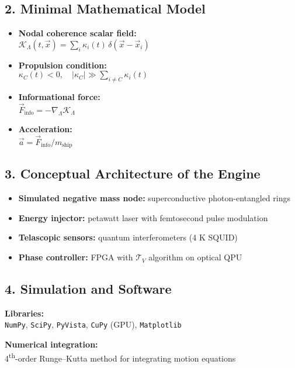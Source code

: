 \documentclass[12pt]{article}
\begin{document}
\subsection*{2. Minimal Mathematical Model}
\begin{itemize}
  \item \textbf{Nodal coherence scalar field:} \\
  $\mathcal{K}_\Lambda(t, \vec{x}) = \sum_i \kappa_i(t)\, \delta(\vec{x} - \vec{x}_i)$

  \item \textbf{Propulsion condition:} \\
  $\kappa_C(t) < 0,\quad |\kappa_C| \gg \sum_{i \ne C} \kappa_i(t)$

  \item \textbf{Informational force:} \\
  $\vec{F}_{\text{info}} = - \nabla_\Lambda \mathcal{K}_\Lambda$

  \item \textbf{Acceleration:} \\
  $\vec{a} = \vec{F}_{\text{info}} / m_{\text{ship}}$
\end{itemize}

\subsection*{3. Conceptual Architecture of the Engine}
\begin{itemize}
  \item \textbf{Simulated negative mass node:} superconductive photon-entangled rings
  \item \textbf{Energy injector:} petawatt laser with femtosecond pulse modulation
  \item \textbf{Telascopic sensors:} quantum interferometers (4 K SQUID)
  \item \textbf{Phase controller:} FPGA with $\mathcal{T}_V$ algorithm on optical QPU
\end{itemize}

\subsection*{4. Simulation and Software}
\textbf{Libraries:} \\
\texttt{NumPy}, \texttt{SciPy}, \texttt{PyVista}, \texttt{CuPy} (GPU), \texttt{Matplotlib}

\textbf{Numerical integration:} \\
4\textsuperscript{th}-order Runge–Kutta method for integrating motion equations
\end{document}
